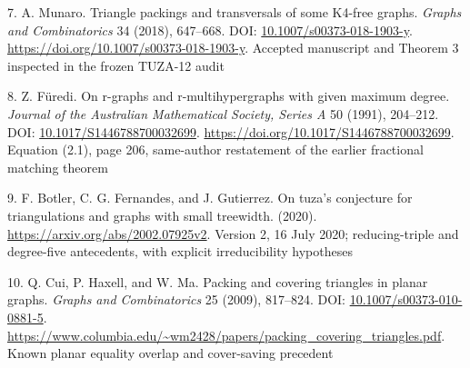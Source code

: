 \documentclass[11pt,a4paper]{article}
\newenvironment{CSLReferences}[2]{\par\setlength{\parindent}{0pt}\setlength{\parskip}{6pt}}{}
\begin{document}
\begin{CSLReferences}{0}{1}
\par{}\label{ref-Munaro2018}
7. A. Munaro. Triangle packings and transversals of some {K4}-free graphs. \emph{Graphs and Combinatorics} 34 (2018), 647--668. DOI: \href{https://doi.org/10.1007/s00373-018-1903-y}{10.1007/s00373-018-1903-y}. \url{https://doi.org/10.1007/s00373-018-1903-y}. Accepted manuscript and Theorem 3 inspected in the frozen TUZA-12 audit

\par{}\label{ref-Furedi1991}
8. Z. Füredi. On r-graphs and r-multihypergraphs with given maximum degree. \emph{Journal of the Australian Mathematical Society, Series A} 50 (1991), 204--212. DOI: \href{https://doi.org/10.1017/S1446788700032699}{10.1017/S1446788700032699}. \url{https://doi.org/10.1017/S1446788700032699}. Equation (2.1), page 206, same-author restatement of the earlier fractional matching theorem

\par{}\label{ref-BFG2020}
9. F. Botler, C. G. Fernandes, and J. Gutierrez. On tuza's conjecture for triangulations and graphs with small treewidth. (2020). \url{https://arxiv.org/abs/2002.07925v2}. Version 2, 16 July 2020; reducing-triple and degree-five antecedents, with explicit irreducibility hypotheses

\par{}\label{ref-Cui2009}
10. Q. Cui, P. Haxell, and W. Ma. Packing and covering triangles in planar graphs. \emph{Graphs and Combinatorics} 25 (2009), 817--824. DOI: \href{https://doi.org/10.1007/s00373-010-0881-5}{10.1007/s00373-010-0881-5}. \url{https://www.columbia.edu/~wm2428/papers/packing_covering_triangles.pdf}. Known planar equality overlap and cover-saving precedent

\end{CSLReferences}
\end{document}
